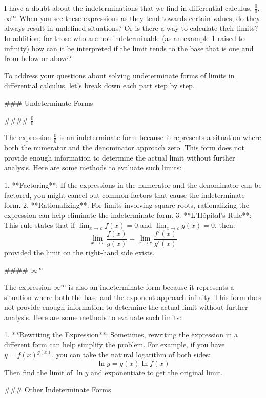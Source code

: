 \documentclass[14pt]{article}
\begin{document}
\begin{Large}
I have a doubt about the indeterminations that we find in differential calculus.
$\frac{0}{0}$, $\infty^{\infty}$
When you see these expressions as they tend towards certain values, do they always result in undefined situations? Or is there a way to calculate their limits?
In addition, for those who are not indeterminable (as an example 1 raised to infinity) how can it be interpreted if the limit tends to the base that is one and from below or above?

To address your questions about solving undeterminate forms of limits in differential calculus, let's break down each part step by step.

### Undeterminate Forms

#### \(\frac{0}{0}\)

The expression \(\frac{0}{0}\) is an indeterminate form because it represents a situation where both the numerator and the denominator approach zero. This form does not provide enough information to determine the actual limit without further analysis. Here are some methods to evaluate such limits:

1. **Factoring**: If the expressions in the numerator and the denominator can be factored, you might cancel out common factors that cause the indeterminate form.
2. **Rationalizing**: For limits involving square roots, rationalizing the expression can help eliminate the indeterminate form.
3. **L'Hôpital's Rule**: This rule states that if \(\lim_{x \to c} f(x) = 0\) and \(\lim_{x \to c} g(x) = 0\), then:
   \[
   \lim_{x \to c} \frac{f(x)}{g(x)} = \lim_{x \to c} \frac{f'(x)}{g'(x)}
   \]
   provided the limit on the right-hand side exists.

#### \(\infty^{\infty}\)

The expression \(\infty^{\infty}\) is also an indeterminate form because it represents a situation where both the base and the exponent approach infinity. This form does not provide enough information to determine the actual limit without further analysis. Here are some methods to evaluate such limits:

1. **Rewriting the Expression**: Sometimes, rewriting the expression in a different form can help simplify the problem. For example, if you have \(y = f(x)^{g(x)}\), you can take the natural logarithm of both sides:
   \[
   \ln y = g(x) \ln f(x)
   \]
   Then find the limit of \(\ln y\) and exponentiate to get the original limit.

### Other Indeterminate Forms


\end{Large}
\end{document}
